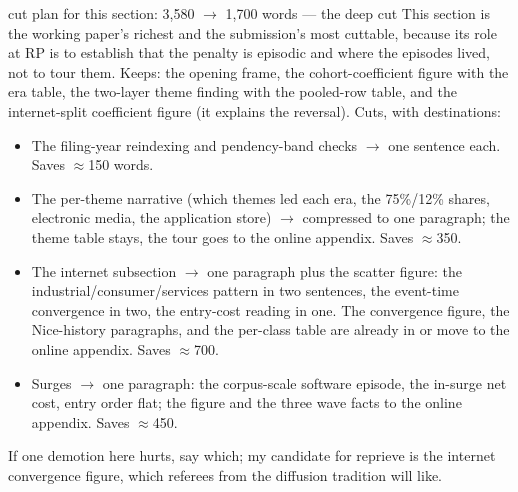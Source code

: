 \begin{ericbox}{cut plan for this section: 3,580 $\to$ 1,700 words --- the deep cut}
This section is the working paper's richest and the submission's most
cuttable, because its role at RP is to establish that the penalty is
episodic and where the episodes lived, not to tour them. Keeps: the
opening frame, the cohort-coefficient figure with the era table, the
two-layer theme finding with the pooled-row table, and the internet-split
coefficient figure (it explains the reversal). Cuts, with destinations:
\begin{itemize}[nosep]
\item The filing-year reindexing and pendency-band checks $\to$ one
sentence each. Saves $\approx$150 words.
\item The per-theme narrative (which themes led each era, the 75\%/12\%
shares, electronic media, the application store) $\to$ compressed to one
paragraph; the theme table stays, the tour goes to the online appendix.
Saves $\approx$350.
\item The internet subsection $\to$ one paragraph plus the scatter
figure: the industrial/consumer/services pattern in two sentences, the
event-time convergence in two, the entry-cost reading in one. The
convergence figure, the Nice-history paragraphs, and the per-class table
are already in or move to the online appendix. Saves $\approx$700.
\item Surges $\to$ one paragraph: the corpus-scale software episode, the
in-surge net cost, entry order flat; the figure and the three wave facts
to the online appendix. Saves $\approx$450.
\end{itemize}
If one demotion here hurts, say which; my candidate for reprieve is the
internet convergence figure, which referees from the diffusion tradition
will like.
\end{ericbox}
